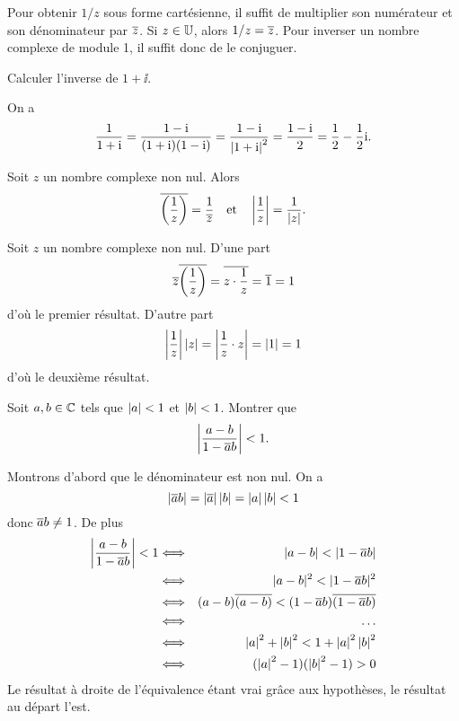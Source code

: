 \documentclass{magnolia}
\begin{document}
\begin{remarques}
\remarque Pour obtenir $1/z$ sous forme cartésienne, il suffit de multiplier son
  numérateur et son dénominateur par $\overline{z}$.
\remarque Si $z\in\U$, alors $1/z=\overline{z}$. Pour inverser un nombre complexe de module 1, il suffit donc de le conjuguer.
\end{remarques}

\begin{exoUnique}
\exo Calculer l'inverse de $1+\ii$.
  \begin{sol}
  On a
  \[\frac{1}{1+{\rm i}}=\frac{1-{\rm i}}{(1+{\rm i})(1-{\rm i})}=\frac{1-{\rm i}}{\left|1+{\rm i}\right|^2}=\frac{1-{\rm i}}{2}=\frac{1}{2}-\frac{1}{2}{\rm i}.\]
  \end{sol}
\end{exoUnique}

\begin{proposition}
  Soit $z$ un nombre complexe non nul. Alors
  $$\overline{\left(\frac{1}{z}\right)}=\frac{1}{\overline{z}} \quad \text{et} \quad
    \left|\frac{1}{z}\right|=\frac{1}{\left|z\right|}.$$
\end{proposition}

\begin{preuve}
Soit $z$ un nombre complexe non nul. D'une part
\[\overline{z}\overline{\left(\frac{1}{z}\right)}=\overline{z\cdot\frac{1}{z}}=\overline{1}=1\]
d'où le premier résultat. D'autre part
\[\left|\frac{1}{z}\right|\left|z\right|=\left|\frac{1}{z}\cdot z\right|=\left|1\right|=1\]
d'où le deuxième résultat.
\end{preuve}

\begin{exoUnique}
\exo Soit $a,b\in\mathbb{C}$ tels que $\left|a\right|<1$ et $\left|b\right|<1$. Montrer que
  \[\left|\frac{a-b}{1-\overline{a}b}\right|<1.\]
\begin{sol}
Montrons d'abord que le dénominateur est non nul. On a
\[\left|\overline{a}b\right|=\left|\overline{a}\right|\left|b\right|=\left|a\right|\left|b\right|<1\]
donc $\overline{a}b\neq 1$. De plus
 \begin{eqnarray*}
 \abs{\frac{a-b}{1-\conj{a}b}}<1&\Longleftrightarrow &|a-b|<|1-\conj{a}b|\\
 &\Longleftrightarrow & |a-b|^2<|1-\conj{a}b|^2\\
 &\Longleftrightarrow & (a-b)\conj{(a-b)}<(1-\conj{a}b)\conj{(1-\conj{a}b)}\\
 &\Longleftrightarrow & \ldots \\
 &\Longleftrightarrow & \abs{a}^2+\abs{b}^2<1+\abs{a}^2\abs{b}^2 \\
 &\Longleftrightarrow & (\abs{a}^2-1)(\abs{b}^2-1)>0
 \end{eqnarray*}
  Le résultat à droite de l'équivalence étant vrai grâce aux hypothèses, le résultat au départ l'est.
  \end{sol}
\end{exoUnique}
\end{document}
